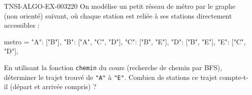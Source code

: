 \begin{exercice}{TNSI-ALGO-EX-003}{2}{20}
On modélise un petit réseau de métro par le graphe (non orienté) suivant, où chaque station est reliée à ses stations directement accessibles :
\begin{python}
metro = {
    "A": ["B"],
    "B": ["A", "C", "D"],
    "C": ["B", "E"],
    "D": ["B", "E"],
    "E": ["C", "D"],
}
\end{python}
En utilisant la fonction \lstinline{chemin} du cours (recherche de chemin par BFS), déterminer le trajet trouvé de \texttt{"A"} à \texttt{"E"}. Combien de stations ce trajet compte-t-il (départ et arrivée compris) ?
\end{exercice}
